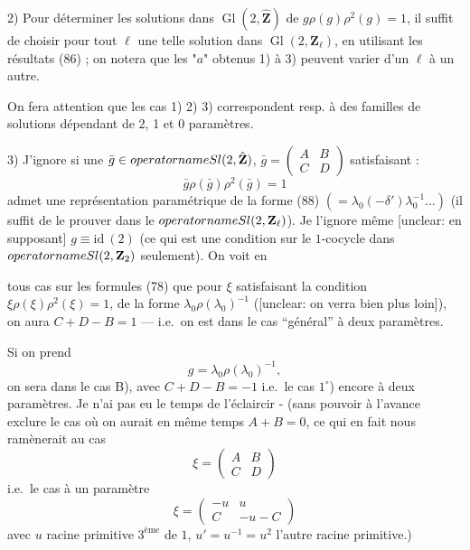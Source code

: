 \begin{enumerate}
2) Pour déterminer les solutions dans $\operatorname{Gl}(2, \hat{\mathbf{Z}})$
de $g\rho(g)\rho^2(g)=1$, il suffit de choisir pour
tout $\ell$ une telle solution dans $\operatorname{Gl}(2, \mathbf{Z}_\ell)$, en
utilisant les résultats (86) ; on notera que
les "$a$" obtenus 1) à 3) peuvent varier d'un
$\ell$ à un autre.

On fera attention que les cas 1) 2) 3)
correspondent resp. à des familles de
solutions dépendant de 2, 1 et 0 paramètres.

3) J'ignore si une $\bar{g} \in \\operatorname{Sl}(2, \hat{\mathbf{Z}})$, $\bar{g} = \left(\begin{smallmatrix} A & B \\ C & D \end{smallmatrix}\right)$ satisfaisant :
$$ \bar{g} \rho(\bar{g}) \rho^2(\bar{g}) = 1 $$
admet une représentation
\marginpar{[unclear: NB $g \mapsto \lambda_0^{-1} g \lambda_0$ conserve les relations du centre, l'équation $g' = -\lambda_0^{-1} g \lambda_0$]}paramétrique de la forme (88)
$(= \lambda_0 ( - \delta' ) \lambda_0^{-1} \dots)$
(il suffit
de le prouver dans le $\\operatorname{Sl}(2, \mathbf{Z}_\ell)$).
Je l'ignore même [unclear: en supposant] $g \equiv \mathrm{id} \ (2)$
(ce qui est une condition sur le $1$-cocycle
dans $\\operatorname{Sl}(2, \mathbf{Z}_2)$ seulement). On voit en

\newpage


tous cas sur les formules (78) que pour $\xi$ satisfaisant la condition $\xi\rho(\xi)\rho^2(\xi)=1$, de la forme $\lambda_0\rho(\lambda_0)^{-1}$ ([unclear: on verra bien plus loin]), on aura $C+D-B=1$ --- i.e.\ on est dans le cas ``général'' à deux paramètres.

Si on prend
$$
g = \lambda_0 \rho (\lambda_0)^{-1},
$$
on sera dans le cas B), avec $C+D-B=-1$
i.e.\ le cas $1^\circ$) encore à deux paramètres. Je n'ai pas eu le temps de l'éclaircir -
(sans pouvoir à l'avance exclure le cas où on aurait en même temps
$A+B=0$, ce qui en fait nous ramènerait au cas
$$
\xi = \begin{pmatrix} A & B \\ C & D \end{pmatrix}
$$
i.e.\ le cas à un paramètre
$$
\xi = \begin{pmatrix} -u & u \\ C & -u-C \end{pmatrix}
$$
avec $u$ racine primitive $3^{\text{ème}}$ de $1$,
$u' = u^{-1} = u^2$ l'autre racine primitive.)


\end{enumerate}
